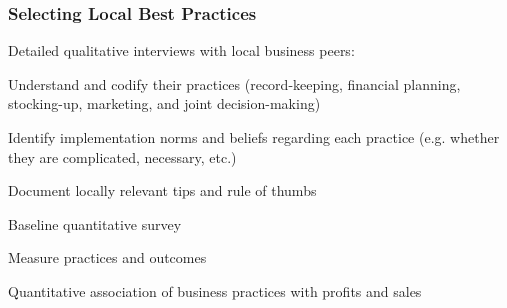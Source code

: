 \documentclass[hideothersubsections, usenames,dvipsnames,10pt]{beamer}
\newenvironment{itemize_3pt}{\itemize\addtolength{\itemsep}{3pt}}{\enditemize}
\begin{document}
\begin{frame}
\frametitle{Selecting Local Best Practices}
\begin{itemize_3pt}
\item Detailed \textcolor{bdf}{qualitative interviews} with local business peers:
    \begin{itemize_3pt}
    \item Understand and codify their practices (record-keeping, financial planning, stocking-up, marketing, and joint decision-making)
    \item Identify implementation norms and beliefs regarding each practice (e.g. whether they are complicated, necessary, etc.)
    \item Document locally relevant tips and rule of thumbs
    \end{itemize_3pt}
\vspace{0.1in}
\item Baseline \textcolor{bdf}{quantitative survey}
    \begin{itemize_3pt}
    \item Measure practices and outcomes
    \item Quantitative association of business practices with profits and sales
    \end{itemize_3pt}
\end{itemize_3pt}
\end{frame}
\end{document}

